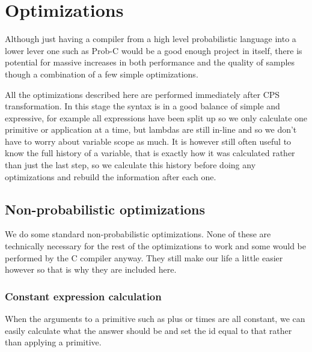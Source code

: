 \documentclass[a4paper]{article}
\begin{document}
\section{Optimizations}

Although just having a compiler from a high level probabilistic language into a lower lever one such as Prob-C would be a good enough project in itself, there is potential for massive increases in both performance and the quality of samples though a combination of a few simple optimizations.

All the optimizations described here are performed immediately after CPS transformation. In this stage the syntax is in a good balance of simple and expressive, for example all expressions have been split up so we only calculate one primitive or application at a time, but lambdas are still in-line and so we don't have to worry about variable scope as much. It is however still often useful to know the full history of a variable, that is exactly how it was calculated rather than just the last step, so we calculate this history before doing any optimizations and rebuild the information after each one.




\subsection{Non-probabilistic optimizations}

We do some standard non-probabilistic optimizations. None of these are technically necessary for the rest of the optimizations to work and some would be performed by the C compiler anyway. They still make our life a little easier however so that is why they are included here.




\subsubsection{Constant expression calculation}

When the arguments to a primitive such as plus or times are all constant, we can easily calculate what the answer should be and set the id equal to that rather than applying a primitive.
\end{document}
